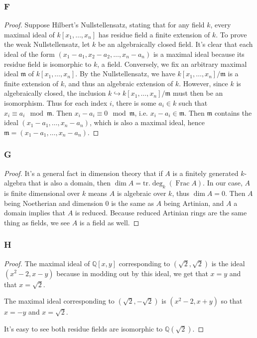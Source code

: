 \documentclass{article}
\newcommand{\Q}{\mathbb{Q}}
\newcommand{\frkm}{\mathfrak{m}}
\DeclareMathOperator{\Frac}{\mathrm{Frac}}
\begin{document}
\subsubsection{F}\label{3.2.F}
\begin{proof}
    Suppose Hilbert's Nullstellensatz, stating that for any field $k$, every maximal ideal of $k[x_1,\dots,x_n]$ has residue field a finite extension of $k$. To prove the weak Nullstellensatz, let $k$ be an algebraically closed field. It's clear that each ideal of the form $(x_1-a_1,x_2-a_2,\dots,x_n-a_n)$ is a maximal ideal because its residue field is isomorphic to $k$, a field. Conversely, we fix an arbitrary maximal ideal $\frkm$ of $k[x_1,\dots,x_n]$. By the Nullstellensatz, we have $k[x_1,\dots,x_n]/\frkm $ is a finite extension of $k$, and thus an algebraic extension of $k$. However, since $k$ is algebraically closed, the inclusion $k\hookrightarrow k[x_1,\dots,x_n]/\frkm$ must then be an isomorphism. Thus for each index $i$, there is some $a_i \in k$ such that $x_i\equiv a_i \mod \frkm$. Then $x_i-a_i \equiv 0 \mod \frkm$, i.e. $x_i-a_i\in \frkm$. Then $\frkm$ contains the ideal $(x_1-a_1,\dots,x_n-a_n)$, which is also a maximal ideal, hence $\frkm=(x_1-a_1,\dots,x_n-a_n)$.
\end{proof}
\subsubsection{G}\label{3.2.G}
\begin{proof}
    It's a general fact in dimension theory that if $A$ is a finitely generated $k$-algebra that is also a domain, then $\dim A = \mathrm{tr}.\deg_k(\Frac A)$. In our case, $A$ is finite dimensional over $k$ means $A$ is algebraic over $k$, thus $\dim A = 0$. Then $A$ being Noetherian and dimension $0$ is the same as $A$ being Artinian, and $A$ a domain implies that $A$ is reduced. Because reduced Artinian rings are the same thing as fields, we see $A$ is a field as well.
\end{proof}
\subsubsection{H}\label{3.2.H}
\begin{proof}
    The maximal ideal of $\Q[x,y]$ corresponding to $(\sqrt{2},\sqrt{2})$ is the ideal $(x^2-2, x-y)$ because in modding out by this ideal, we get that $x=y$ and that $x=\sqrt{2}$.

    The maximal ideal corresponding to $(\sqrt{2},-\sqrt{2})$ is $(x^2-2,x+y)$ so that $x=-y$ and $x=\sqrt{2}$.
    
    It's easy to see both residue fields are isomorphic to $ \Q(\sqrt{2})$.
\end{proof}
\end{document}
